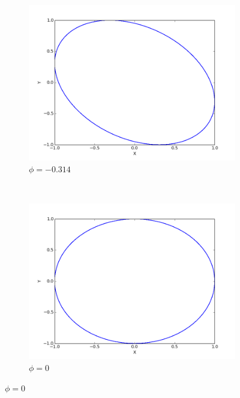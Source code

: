 \documentclass{article}
\begin{document}
\begin{enumerate}
	\begin{figure}[h]
		\centering
		\begin{subfigure}{0.4\textwidth}
		\centering
		\includegraphics[width=0.9\linewidth]{fig8.png}
		\caption{$\phi = -0.314$}
		\end{subfigure}
		~
		\begin{subfigure}{0.4\textwidth}
		\centering
		\includegraphics[width=0.9\linewidth]{fig9.png}
		\caption{$\phi = 0$}
		\end{subfigure}
		

\end{figure}
\end{enumerate}
\end{document}
